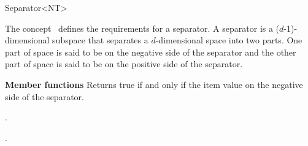 

\begin{ccRefConcept}{Separator<NT>}


\begin{ccAdvanced}

\ccDefinition
  
The concept \ccRefName\ defines the requirements for a separator.
A separator is a ($d$-1)-dimensional subspace that separates a $d$-dimensional space into two parts.
One part of space is said to be on the negative side of the separator and the other part of space is 
said to be on the positive side of the separator.

\ccCreation
{}  %


{\bf Member functions}
{Returns true if and only if the item value on the negative side of the separator.}


\ccHasModels

.

\ccSeeAlso

.

\end{ccAdvanced}

\end{ccRefConcept}


